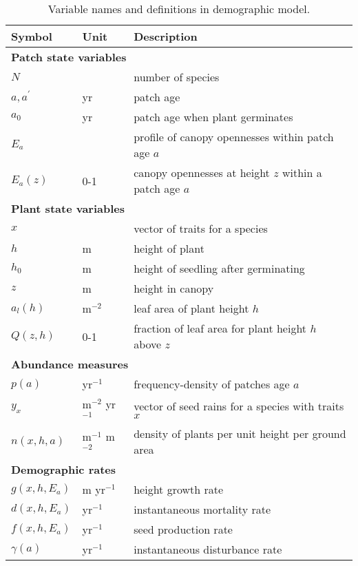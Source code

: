\documentclass[10pt,twoside]{article}
\begin{document}
\begin{table}[ht]
 \caption{Variable names and definitions in demographic model.}
\centering
  \begin{tabular}{p{2cm}p{2cm}p{9cm}}
  \hline
  Symbol & Unit & Description \\
  \hline
  \multicolumn{3}{l}{\textbf{Patch state variables}} \\
  $N$   & & number of species \\
  $a, a^{\prime}$ & yr & patch age \\
  $a_0$ & yr & patch age when plant germinates \\
  $E_a$ & & profile of canopy opennesses within patch age $a$\\
  $E_a(z)$& 0-1 & canopy opennesses at height $z$ within a patch age $a$\\

  \multicolumn{3}{l}{\textbf{Plant state variables}} \\
  $x$   & & vector of traits for a species\\
  $h$   & m & height of plant\\
  $h_0$   & m  & height of seedling after germinating\\
  $z$   & m & height in canopy\\
  $a_l(h)$  & m$^{-2}$ & leaf area of plant height $h$ \\
  $Q(z, h)$ & 0-1 & fraction of leaf area for plant height $h$ above $z$\\
 
  \multicolumn{3}{l}{\textbf{Abundance measures}} \\
  $p(a)$ & yr$^{-1}$ & frequency-density of patches age $a$ \\
  $y_x$ & m$^{-2}$ yr$^{-1}$ & vector of seed rains for a species with traits $x$\\
  $n(x,h,a)$ & m$^{-1}$ m$^{-2}$ & density of plants per unit height per ground area\\

  \multicolumn{3}{l}{\textbf{Demographic rates}} \\
  $g(x,h, E_a)$ & m yr$^{-1}$ & height growth rate \\
  $d(x,h, E_a)$ & yr$^{-1}$ & instantaneous mortality rate \\
  $f(x,h, E_a)$ & yr$^{-1}$ & seed production rate \\
  $\gamma(a)$ & yr$^{-1}$ & instantaneous disturbance rate\\


\end{tabular}
\end{table}
\end{document}

